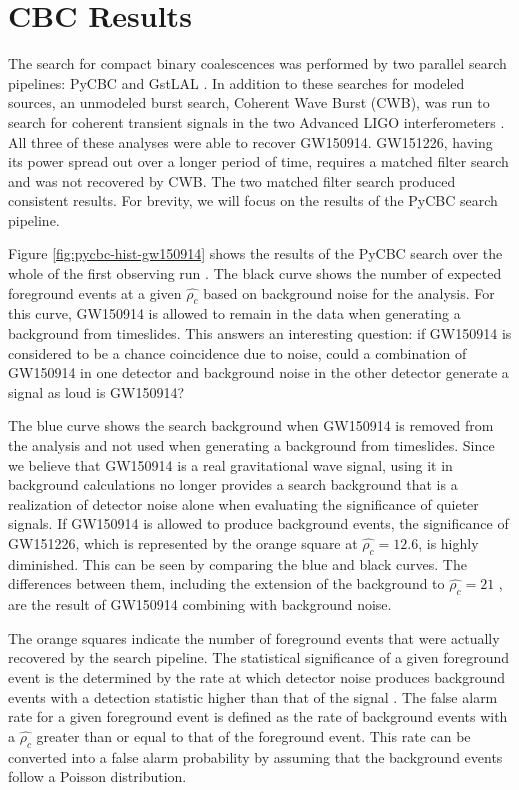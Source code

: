 \section{CBC Results}

The search for compact binary
coalescences was performed by two parallel search pipelines: 
PyCBC \cite{pycbc-github,Usman:2015kfa} and 
GstLAL \cite{gstlal-methods}. 
In addition to these searches for modeled sources, an unmodeled 
burst search, Coherent Wave Burst (CWB), was run to search for coherent 
transient signals in the two Advanced LIGO interferometers \cite{GW150914-BURST}. 
All three of these analyses were able to recover GW150914. GW151226, 
having its power spread out over a longer period of time, requires a 
matched filter search and was not recovered by CWB. The two matched filter 
search produced consistent results. 
For brevity, we will focus on the results of the PyCBC search pipeline.

Figure \ref{fig:pycbc-hist-gw150914} shows the results of the PyCBC search 
over the whole of the first observing run \cite{GW151226}. The black curve shows the 
number of expected foreground events at a given $\hat{\rho_c}$ based on 
background noise for the analysis. For this curve, GW150914 is 
allowed to remain in the data when generating a background from timeslides. 
This answers an interesting question: if GW150914 is considered to be a 
chance coincidence due to noise, could a combination of GW150914 in 
one detector and background noise in the other detector generate a 
signal as loud is GW150914?

The blue curve shows the search background when GW150914 is removed 
from the analysis and not used when generating a background from 
timeslides. Since we believe that GW150914 is a real gravitational wave 
signal, using it in background calculations no longer provides a 
search background that is a realization of detector noise alone 
when evaluating the significance of quieter signals. 
If GW150914 is allowed to produce background events, the 
significance of GW151226, which is represented by the orange square at 
$\hat{\rho_c} = 12.6$, is highly diminished. This can be seen by comparing 
the blue and black curves. The differences between them, including the 
extension of the background to $\hat{\rho_c} = 21$ , are the result 
of GW150914 combining with background noise.

The orange squares indicate the 
number of foreground events that were actually recovered by the search 
pipeline. 
The statistical significance of a given foreground event is 
the determined by the rate at which detector noise produces background 
events with a detection statistic higher than that of the signal 
\cite{GW150914-CBC}. The false alarm rate for a given foreground 
event is defined as the rate of background events with a $\hat{\rho_c}$ 
greater than or equal to that of the foreground event. This rate 
can be converted into a false alarm probability by assuming that the 
background events follow a Poisson distribution. 

